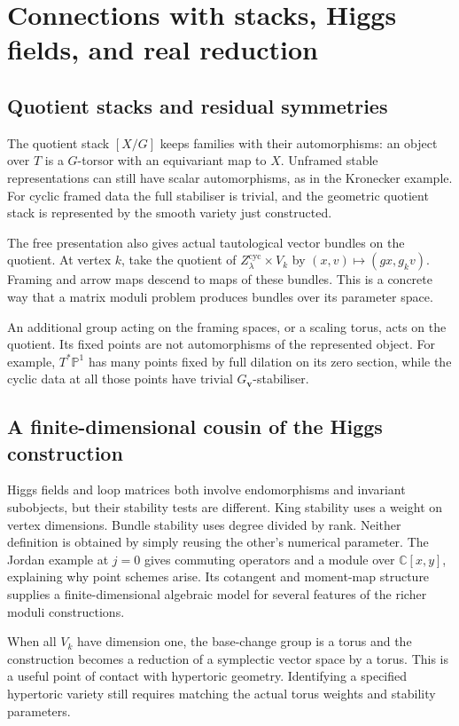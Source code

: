 \documentclass[11pt,a4paper]{article}
\numberwithin{equation}{section}
\theoremstyle{definition}
\newcommand{\PP}{\mathbb P}
\newcommand{\vv}{\mathbf v}
\begin{document}
\section{Connections with stacks, Higgs fields, and real reduction}
\label{sec:connections}

\subsection{Quotient stacks and residual symmetries}
The quotient stack $[X/G]$ keeps families with their
automorphisms: an object over $T$ is a $G$-torsor with an
equivariant map to $X$. Unframed stable representations can
still have scalar automorphisms, as in the Kronecker example.
For cyclic framed data the full stabiliser is trivial, and
the geometric quotient stack is represented by the smooth
variety just constructed.

The free presentation also gives actual tautological vector
bundles on the quotient. At vertex $k$, take the quotient of
$Z_\lambda^{\mathrm{cyc}}\times V_k$ by
$(x,v)\mapsto(gx,g_kv)$. Framing and arrow maps descend to
maps of these bundles. This is a concrete way that a matrix
moduli problem produces bundles over its parameter space.

An additional group acting on the framing spaces, or a scaling
torus, acts on the quotient. Its fixed points are not
automorphisms of the represented object. For example,
$T^*\PP^1$ has many points fixed by full dilation on its zero
section, while the cyclic data at all those points have
trivial $G_\vv$-stabiliser.

\subsection{A finite-dimensional cousin of the Higgs construction}
Higgs fields and loop matrices both involve endomorphisms and
invariant subobjects, but their stability tests are different.
King stability uses a weight on vertex dimensions. Bundle
stability uses degree divided by rank. Neither definition is
obtained by simply reusing the other's numerical parameter.
The Jordan example at $j=0$ gives commuting operators and a
module over $\mathbb C[x,y]$, explaining why point schemes
arise. Its cotangent and moment-map structure supplies a
finite-dimensional algebraic model for several features of
the richer moduli constructions.

When all $V_k$ have dimension one, the base-change group is
a torus and the construction becomes a reduction of a
symplectic vector space by a torus. This is a useful point
of contact with hypertoric geometry. Identifying a specified
hypertoric variety still requires matching the actual torus
weights and stability parameters.
\end{document}
